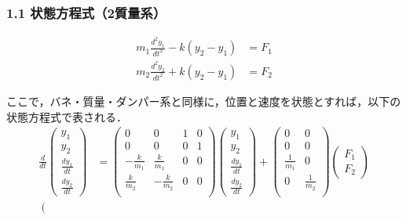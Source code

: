\documentclass[10pt]{beamer}
\begin{document}
\begin{frame}[t]
\frametitle{1.1 状態方程式（2質量系）}
 
\setcounter{eqncountersave}{\value{equation}} %
\addtocounter{equation}{-2} %
\begin{align}
 m_1 \frac{d^2y_1}{dt^2} - k (y_2 - y_1) &= F_1 \\
 m_2 \frac{d^2y_2}{dt^2} + k (y_2 - y_1) &= F_2
\end{align}
\setcounter{equation}{\value{eqncountersave}} %

ここで，バネ・質量・ダンパー系と同様に，位置と速度を状態とすれば，以下の状態方程式で表される．
\begin{align}
 \frac{d}{dt} \left(\begin{array}{c}
               y_1 \\
         y_2 \\
         \frac{dy_1}{dt} \\
         \frac{dy_2}{dt}
        \end{array}\right)
 &=
 \left(\begin{array}{cccc}
        0 & 0 & 1 & 0     \\
        0 & 0 & 0 & 1     \\
  -\frac{k}{m_1} & \frac{k}{m_1} & 0 & 0 \\
  \frac{k}{m_2} & -\frac{k}{m_2} & 0 & 0 \\
       \end{array}\right)
 \left(\begin{array}{c}
        y_1 \\
  y_2 \\
  \frac{dy_1}{dt} \\
  \frac{dy_2}{dt}
       \end{array}\right)
 +
 \left(\begin{array}{cc}
        0 & 0 \\
        0 & 0 \\
  \frac{1}{m_1} & 0 \\
  0 & \frac{1}{m_2} \\
       \end{array}\right)
 \left(\begin{array}{c}
        F_1 \\
  F_2
       \end{array}\right) \\
 \left(\begin{array}{c}

\end{array}
\end{align}
\end{frame}
\end{document}
